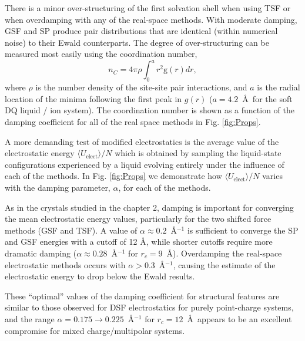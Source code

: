 

There is a minor over-structuring of the first solvation shell when
using TSF or when overdamping with any of the real-space methods.
With moderate damping, GSF and SP produce pair distributions that are
identical (within numerical noise) to their Ewald counterparts.  The
degree of over-structuring can be measured most easily using the
coordination number,
\begin{equation}
n_C = 4\pi\rho \int_{0}^{a}r^2\text{g}(r)dr,
\end{equation}
where $\rho$ is the number density of the site-site pair interactions,
and $a$ is the radial location of the minima following the first peak
in $g(r)$ ($a = 4.2$~\AA\  for the soft DQ liquid / ion system).  The
coordination number is shown as a function of the damping coefficient
for all of the real space methods in Fig. \ref{fig:Props}.

A more demanding test of modified electrostatics is the average value
of the electrostatic energy $\langle U_\mathrm{elect} \rangle / N$
which is obtained by sampling the liquid-state configurations
experienced by a liquid evolving entirely under the influence of each
of the methods.  In Fig. \ref{fig:Props} we demonstrate how $\langle
U_\mathrm{elect} \rangle / N$ varies with the damping parameter,
$\alpha$, for each of the methods. 

As in the crystals studied in the chapter 2, damping is important
for converging the mean electrostatic energy values, particularly for
the two shifted force methods (GSF and TSF).  A value of $\alpha
\approx 0.2$~\AA$^{-1}$ is sufficient to converge the SP and GSF
energies with a cutoff of 12 \AA, while shorter cutoffs require more
dramatic damping ($\alpha \approx 0.28$~\AA$^{-1}$ for $r_c = 9$~\AA).
Overdamping the real-space electrostatic methods occurs with $\alpha >
0.3$~\AA$^{-1}$, causing the estimate of the electrostatic energy to
drop below the Ewald results.

These ``optimal'' values of the damping coefficient for structural
features are similar to those observed for DSF electrostatics for
purely point-charge systems, and the range $\alpha= 0.175 \rightarrow
0.225$~\AA$^{-1}$ for $r_c = 12$~\AA\ appears to be an excellent
compromise for mixed charge/multipolar systems.

